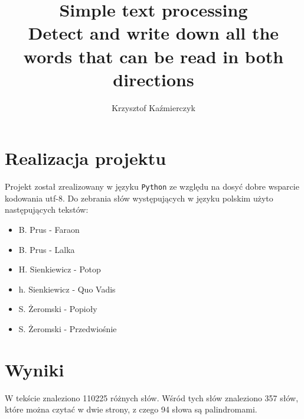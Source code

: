 \documentclass[a4paper,12pt]{article}
\author{Krzysztof Kaźmierczyk}
\title{Simple text processing \\ 
\large{Detect and write down all the words that can be read in both directions}}
\begin{document}
\maketitle 

\section{Realizacja projektu}
Projekt został zrealizowany w języku \texttt{Python} ze względu na dosyć dobre wsparcie kodowania utf-8. Do zebrania słów występujących w języku polskim użyto następujących tekstów:
\begin{itemize}
\item B. Prus - Faraon
\item B. Prus - Lalka
\item H. Sienkiewicz - Potop
\item h. Sienkiewicz - Quo Vadis
\item S. Żeromski - Popioły
\item S. Żeromski - Przedwiośnie
\end{itemize}


\section{Wyniki}
W tekście znaleziono 110225 różnych słów. Wśród tych słów znaleziono 357 słów, które można czytać w dwie strony, z czego 94 słowa są palindromami.
\end{document}
